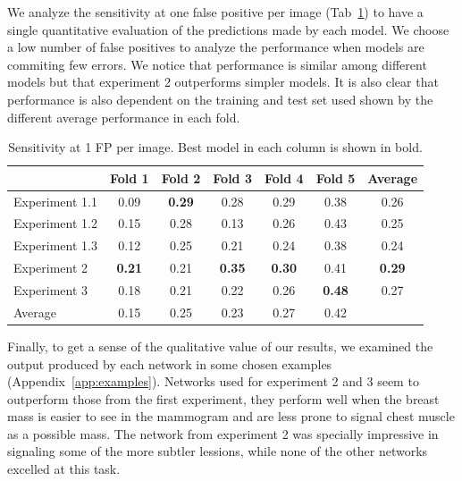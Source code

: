 We analyze the sensitivity at one false positive per image (Tab~\ref{tab:SensitivityResults}) to have a single quantitative evaluation of the predictions made by each model. We choose a low number of false positives to analyze the performance when models are commiting few errors. We notice that performance is similar among different models but that experiment 2 outperforms simpler models. It is also clear that performance is also dependent on the training and test set used shown by the different average performance in each fold.
\begin{table}[h]
	\centering
	\begin{tabular}{l*{6}{c}}
		\hline
		 & \textbf{Fold 1} & \textbf{Fold 2} & \textbf{Fold 3} &\textbf{Fold 4} &\textbf{Fold 5} & \textbf{Average} \\
		\hline 
		Experiment 1.1	&0.09		&\textbf{0.29}	&0.28	&0.29	&0.38	&0.26\\
		Experiment 1.2	&0.15		&0.28		&0.13		&0.26	&0.43	&0.25\\
		Experiment 1.3	&0.12		&0.25		&0.21			&0.24	&0.38	&0.24\\
		Experiment 2	&\textbf{0.21} &0.21	&\textbf{0.35}		&\textbf{0.30}	&0.41	&\textbf{0.29}\\
		Experiment 3	&0.18		&0.21		&0.22		&0.26	&\textbf{0.48}	&0.27\\
		Average			&0.15		&0.25		&0.23			&0.27	&0.42&\\
		\hline
	\end{tabular}
	\caption[Sensitivity at 1 FP/image for the final models]{Sensitivity at 1 FP per image. Best model in each column is shown in bold.}
	\label{tab:SensitivityResults}
\end{table}

Finally, to get a sense of the qualitative value of our results, we examined the output produced by each network in some chosen examples (Appendix~\ref{app:examples}). Networks used for experiment 2 and 3 seem to outperform those from the first experiment, they perform well when the breast mass is easier to see in the mammogram and are less prone to signal chest muscle as a possible mass. The network from experiment 2 was specially impressive in signaling some of the more subtler lessions, while none of the other networks excelled at this task.

